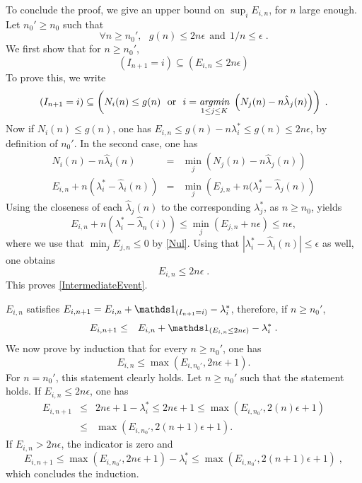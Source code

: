 \documentclass{colt2016} %
\begin{document}
To conclude the proof, we give an upper bound on $\sup_i E_{i,n}$, for $n$ large enough. Let $n_0' \geq n_0$ such that 
\[\forall n \geq n_0', \ \ \ g(n) \leq 2n \epsilon \ \ \text{and} \ \ 1/n \leq \epsilon\;.\]
We first show that for $n\geq n_0'$,  
\begin{equation}
(I_{n+1} = i) \subseteq \left(E_{i,n} \leq 2n \epsilon\right)\label{IntermediateEvent}
\end{equation}
To prove this, we write 
\[(I_{n+1} = i) \subseteq \left(N_i(n) \leq g(n) \ \ \text{or} \ \ i = \underset{1 \leq j \leq K}{\emph{argmin}} \ \left(N_j(n) - n \hat{\lambda}_j(n)\right)\right)\;.
\]
Now if $N_i(n) \leq g(n)$, one has $E_{i,n} \leq g(n) - n\lambda^*_i \leq g(n) \leq 2n\epsilon$,  by definition of $n_0'$.  In the second case, one has 
\begin{eqnarray*}
 N_i(n) - n \hat{\lambda}_i(n) &= &\min_j \left(N_j(n) - n \hat{\lambda}_j(n)\right) \\
 E_{i,n} + n(\lambda^*_i - \hat{\lambda}_i(n)) & = & \min_j  \left(E_{j,n} + n(\lambda^*_j - \hat{\lambda}_j(n)\right) 
\end{eqnarray*}
Using the closeness of each $\hat{\lambda}_j(n)$ to the corresponding $\lambda_j^*$, as $n\geq n_0$, yields
\[E_{i,n} + n(\lambda^*_i - \hat{\lambda}_n(i)) \leq  \min_j  \left(E_{j,n} + n\epsilon\right) \leq n\epsilon,\]
where we use that $\min_j E_{j,n} \leq 0$ by \eqref{Nul}. Using that $|\lambda^*_i - \hat{\lambda}_i(n)| \leq \epsilon$ as well, one obtains 
\[E_{i,n} \leq 2n\epsilon\;.\]
This proves \eqref{IntermediateEvent}. 

$E_{i,n}$ satisfies $E_{i,n+1} = E_{i,n} + \ind_{(I_{n+1}=i)} - \lambda_i^*$, therefore, if $n\geq n_0'$, 
\begin{eqnarray*}
 E_{i,n+1} &\leq& E_{i,n} + \ind_{(E_{i,n} \leq 2n\epsilon)} - \lambda_i^*\;. 
\end{eqnarray*}
We now prove by induction that for every $n \geq n_0'$, one has 
\[E_{i,n} \leq \max(E_{i,n_0'}, 2n\epsilon +1 ).\]
For $n=n_0'$, this statement clearly holds. Let $n\geq n_0'$ such that the statement holds.
If $E_{i,n} \leq 2n\epsilon$, one has 
\begin{eqnarray*}E_{i,n+1} &\leq& 2n\epsilon + 1 - \lambda_i^* \leq 2n\epsilon +1 \leq \max(E_{i,n_0'},2(n)\epsilon+1) \\
&\leq& \max(E_{i,n_0'},2(n+1)\epsilon +1).\end{eqnarray*}
If $E_{i,n} > 2n\epsilon$, the indicator is zero and  
\[E_{i,n+1} \leq \max(E_{i,n_0'},2n\epsilon +1) - \lambda_i^* \leq \max(E_{i,n_0'},2(n+1)\epsilon+1)\;,\]
which concludes the induction. 
\end{document}
